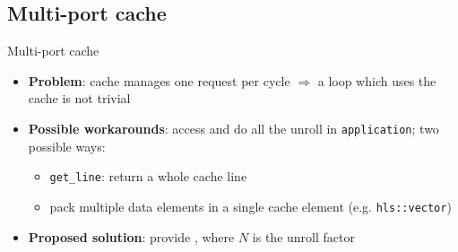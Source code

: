 \documentclass[handout]{beamer}
\begin{document}
\subsection{Multi-port cache}
\begin{frame}{Multi-port cache}
	\begin{itemize}[<+->]
		\item \textbf{Problem}: cache manages one request per cycle
			$\Rightarrow$  a loop which uses the cache is not
			trivial
		\item \textbf{Possible workarounds}:
			access 
			and do all the unroll in \texttt{application}; two possible ways:
			\begin{itemize}[<.->]
				\item \texttt{get\_line}: return a whole cache
					line
				\item pack multiple data elements in a single
					cache element (e.g. \texttt{hls::vector})
			\end{itemize}
		\item \textbf{Proposed solution}: provide ,
			where $N$ is the unroll factor
	\end{itemize}
\end{frame}
\end{document}
